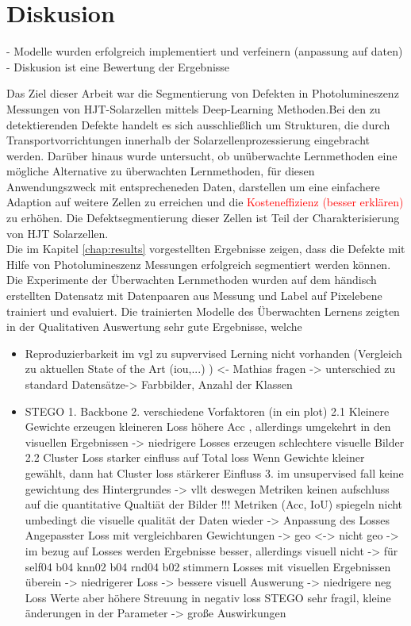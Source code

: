 \chapter{Diskusion}
\label{chap:discussion}

- Modelle wurden erfolgreich implementiert und verfeinern (anpassung auf daten)
- Diskusion ist eine Bewertung der Ergebnisse


Das Ziel dieser Arbeit war die Segmentierung von Defekten in Photolumineszenz Messungen von HJT-Solarzellen mittels Deep-Learning Methoden.Bei den zu detektierenden Defekte handelt es sich ausschließlich um Strukturen, die durch Transportvorrichtungen innerhalb der Solarzellenprozessierung eingebracht werden. Darüber hinaus wurde untersucht, ob unüberwachte Lernmethoden eine mögliche Alternative zu überwachten Lernmethoden, für diesen Anwendungszweck mit entsprecheneden Daten, darstellen um eine einfachere Adaption auf weitere Zellen zu erreichen und die \textcolor{red}{Kosteneffizienz (besser erklären) } zu erhöhen. Die Defektsegmentierung dieser Zellen ist Teil der Charakterisierung von HJT Solarzellen. \\
Die im Kapitel \ref{chap:results} vorgestellten Ergebnisse zeigen, dass die Defekte mit Hilfe von Photolumineszenz Messungen erfolgreich segmentiert werden können. \\
Die Experimente der Überwachten Lernmethoden wurden auf dem händisch erstellten Datensatz mit Datenpaaren aus Messung und Label auf Pixelebene trainiert und evaluiert. 
Die trainierten Modelle des Überwachten Lernens zeigten in der Qualitativen Auswertung sehr gute Ergebnisse, welche 

  


\begin{itemize}
    \item Reproduzierbarkeit im vgl zu supvervised Lerning nicht vorhanden (Vergleich zu aktuellen State of the Art (iou,...) ) <- Mathias fragen 
    -> unterschied zu standard Datensätze-> Farbbilder, Anzahl der Klassen 
    \item  STEGO
    1. Backbone 
    2. verschiedene Vorfaktoren (in ein plot)
        2.1 Kleinere Gewichte erzeugen kleineren Loss 
            höhere Acc , allerdings umgekehrt in den visuellen Ergebnissen -> niedrigere Losses erzeugen schlechtere visuelle Bilder
        2.2 Cluster Loss starker einfluss auf Total loss
            Wenn Gewichte kleiner gewählt,  dann hat Cluster loss stärkerer Einfluss 
    3. im unsupervised fall keine gewichtung des Hintergrundes -> vllt deswegen Metriken keinen aufschluss auf die quantitative Qualtiät der Bilder
    !!! Metriken (Acc, IoU) spiegeln nicht umbedingt die visuelle qualität der Daten wieder -> Anpassung des Losses 
    Angepasster Loss mit vergleichbaren Gewichtungen -> geo <-> nicht geo
        -> im bezug auf Losses werden Ergebnisse besser, allerdings visuell nicht
        -> für self04 b04 knn02 b04 rnd04 b02 stimmern Losses mit visuellen Ergebnissen überein -> niedrigerer Loss -> bessere visuell Auswerung
        -> niedrigere neg Loss Werte  aber höhere Streuung in negativ loss
    STEGO sehr fragil, kleine änderungen in der Parameter -> große Auswirkungen
\end{itemize}